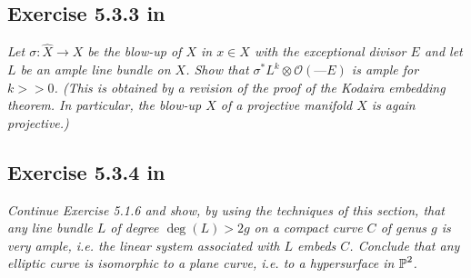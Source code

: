\documentclass{article}
\begin{document}
\subsection*{Exercise 5.3.3 in \cite{Huy}}
\emph{Let $\sigma : \hat X \to X$ be the blow-up of $X$ in $x \in X$ with the exceptional divisor
$E$ and let $L$ be an ample line bundle on $X$. Show that $\sigma^*L^k \otimes \mathcal{O}(—E)$ is ample for
$k>>0$.
(This is obtained by a revision of the proof of the Kodaira embedding theorem.
In particular, the blow-up $X$ of a projective manifold $X$ is again projective.)}
\vspace{3mm}


\subsection*{Exercise 5.3.4 in \cite{Huy}}
\emph{Continue Exercise 5.1.6 and show, by using the techniques of this section,
that any line bundle $L$ of degree $\deg(L) > 2g$ on a compact curve $C$ of genus $g$ is
very ample, i.e. the linear system associated with $L$ embeds $C$.
Conclude that any elliptic curve is isomorphic to a plane curve, i.e. to a hypersurface
in $\operatorname{\mathbb{P}}^2$.}
\vspace{3mm}
\end{document}
